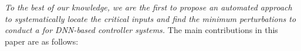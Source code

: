 {\textit{To the best of our knowledge, we are the first to  propose an automated approach to systematically locate the critical inputs and find the minimum perturbations to conduct a \attack for DNN-based controller systems.}}
\newline
The main contributions in this paper are as follows:
\newline
